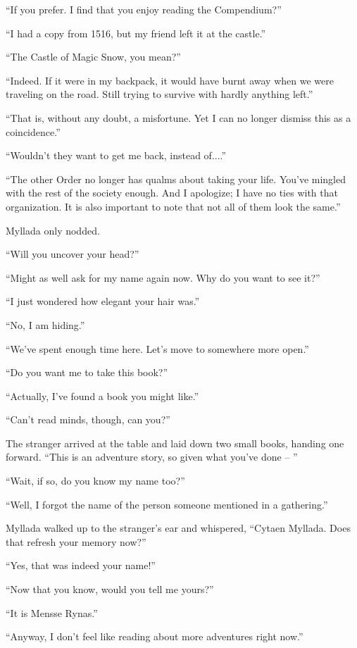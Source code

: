 ``If you prefer. I find that you enjoy reading the Compendium?''

``I had a copy from 1516, but my friend left it at the castle.''

``The Castle of Magic Snow, you mean?''

``Indeed. If it were in my backpack, it would have burnt away when we were traveling on the road. Still trying to survive with hardly anything left.''

``That is, without any doubt, a misfortune. Yet I can no longer dismiss this as a coincidence.''

``Wouldn't they want to get me back, instead of....''

``The other Order no longer has qualms about taking your life. You've mingled with the rest of the society enough. And I apologize; I have no ties with that organization. It is also important to note that not all of them look the same.''

Myllada only nodded.

``Will you uncover your head?''

``Might as well ask for my name again now. Why do you want to see it?''

``I just wondered how elegant your hair was.''

``No, I am hiding.''

``We've spent enough time here. Let's move to somewhere more open.''

``Do you want me to take this book?''

``Actually, I've found a book you might like.''

``Can't read minds, though, can you?''

\centeredstars

The stranger arrived at the table and laid down two small books, handing one forward. ``This is an adventure story, so given what you've done -- ''

``Wait, if so, do you know my name too?''

``Well, I forgot the name of the person someone mentioned in a gathering.''

Myllada walked up to the stranger's ear and whispered, ``Cytaen Myllada. Does that refresh your memory now?''

``Yes, that was indeed your name!''

``Now that you know, would you tell me yours?''

``It is Mensse Rynas.''

``Anyway, I don't feel like reading about more adventures right now.''

